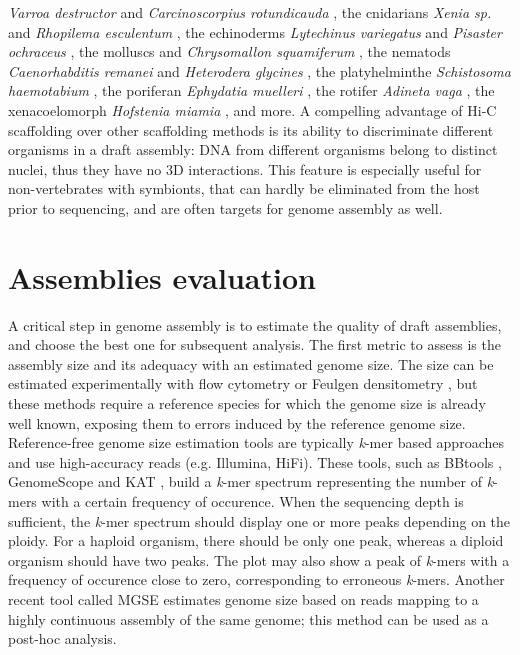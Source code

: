 \textit{Varroa destructor} \cite{varroa_destructor} and \textit{Carcinoscorpius rotundicauda} \cite{carcinoscorpius_rotundicauda2}, the cnidarians \textit{Xenia sp.} \cite{xenia_sp} and \textit{Rhopilema esculentum} \cite{rhopilema_esculentum}, the echinoderms \textit{Lytechinus variegatus} \cite{lytechinus_variegatus} and \textit{Pisaster ochraceus} \cite{pisaster_ochraceus}, the molluscs \cite{scapharca_broughtonii} and \textit{Chrysomallon squamiferum} \cite{chrysomallon_squamiferum}, the nematods \textit{Caenorhabditis remanei} \cite{caenorhabditis_remanei2} and \textit{Heterodera glycines} \cite{heterodera_glycines2}, the platyhelminthe \textit{Schistosoma haemotabium} \cite{schistosoma_haematobium}, the poriferan \textit{Ephydatia muelleri} \cite{ephydatia_mulleri}, the rotifer \textit{Adineta vaga} \cite{adineta_vaga2}, the xenacoelomorph \textit{Hofstenia miamia} \cite{hofstenia_miamia}, and more. A compelling advantage of Hi-C scaffolding over other scaffolding methods is its ability to discriminate different organisms in a draft assembly: DNA from different organisms belong to distinct nuclei, thus they have no 3D interactions. This feature is especially useful for non-vertebrates with symbionts, that can hardly be eliminated from the host prior to sequencing, and are often targets for genome assembly as well.

\section{Assemblies evaluation}

A critical step in genome assembly is to estimate the quality of draft assemblies, and choose the best one for subsequent analysis. The first metric to assess is the assembly size and its adequacy with an estimated genome size. The size can be estimated experimentally with flow cytometry or Feulgen densitometry \cite{mulligan2014}, but these methods require a reference species for which the genome size is already well known, exposing them to errors induced by the reference genome size. Reference-free genome size estimation tools are typically \textit{k}-mer based approaches and use high-accuracy reads (e.g. Illumina, HiFi). These tools, such as BBtools \cite{bbtools}, GenomeScope \cite{genomescope} and KAT \cite{kat_evaluation}, build a \textit{k}-mer spectrum representing the number of \textit{k}-mers with a certain frequency of occurence. When the sequencing depth is sufficient, the \textit{k}-mer spectrum should display one or more peaks depending on the ploidy. For a haploid organism, there should be only one peak, whereas a diploid organism should have two peaks. The plot may also show a peak of \textit{k}-mers with a frequency of occurence close to zero, corresponding to erroneous \textit{k}-mers. Another recent tool called MGSE \cite{mgse} estimates genome size based on reads mapping to a highly continuous assembly of the same genome; this method can be used as a post-hoc analysis. \\

